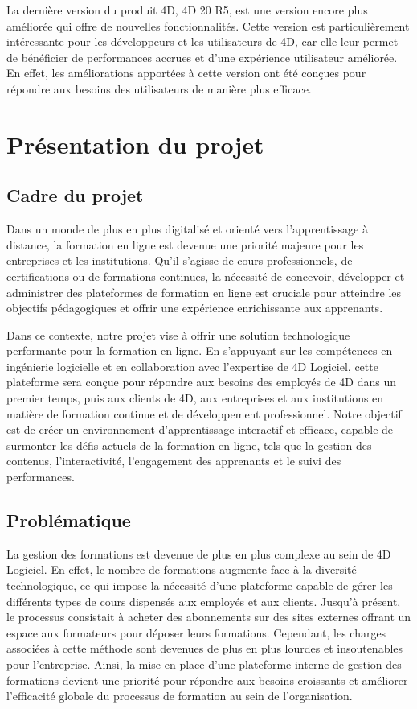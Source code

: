 La dernière version du produit 4D, 4D 20 R5, est une version encore plus améliorée qui offre de nouvelles 
fonctionnalités. Cette version est particulièrement intéressante pour les développeurs et les utilisateurs de 4D,
car elle leur permet de bénéficier de performances accrues et d’une expérience utilisateur améliorée.
En effet, les améliorations apportées à cette version ont été conçues pour répondre aux besoins des utilisateurs de manière plus eﬀicace.



\section{Présentation du projet}

\subsection{Cadre du projet}

Dans un monde de plus en plus digitalisé et orienté 
vers l'apprentissage à distance, la formation en ligne est 
devenue une priorité majeure pour les entreprises et 
les institutions. Qu'il s'agisse de cours professionnels,
 de certifications ou de formations continues, la nécessité de concevoir, développer et administrer des plateformes de formation en ligne est cruciale pour atteindre les objectifs pédagogiques et offrir une expérience enrichissante aux apprenants.
 
 Dans ce contexte, notre projet vise à offrir une solution technologique performante pour la formation en ligne. En s'appuyant sur les compétences en ingénierie logicielle et en collaboration avec l'expertise de 4D Logiciel, cette plateforme sera conçue pour répondre aux besoins des employés de 4D dans un premier temps, puis aux clients de 4D, aux entreprises et aux institutions en matière de formation continue et de développement professionnel. Notre objectif est de créer un environnement d'apprentissage interactif et efficace, capable de surmonter les défis actuels de la formation en ligne, tels que la gestion des contenus, l'interactivité, l'engagement des apprenants et le suivi des performances.

 \subsection{Problématique}

 La gestion des formations est devenue de plus en plus complexe au sein de 4D Logiciel. En effet, le nombre de formations augmente face à la diversité technologique, ce qui impose la nécessité d’une plateforme capable de gérer les différents types de cours dispensés aux employés et aux clients.  Jusqu'à présent, le processus consistait à acheter des abonnements sur des sites externes offrant un espace aux formateurs pour déposer leurs formations. Cependant, les charges associées à cette méthode sont devenues de plus en plus lourdes et insoutenables pour l'entreprise. Ainsi, la mise en place d'une plateforme interne de gestion des formations devient une priorité pour répondre aux besoins croissants et améliorer l'efficacité globale du processus de formation au sein de l'organisation.
 
